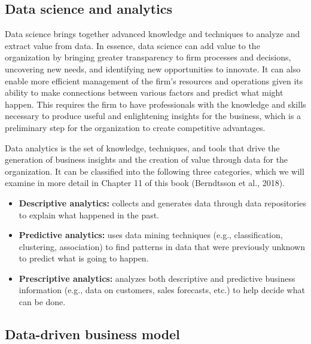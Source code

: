 \documentclass[
  letterpaper,
  DIV=11,
  numbers=noendperiod]{scrreprt}
\begin{document}
\hypertarget{data-science-and-analytics}{%
\subsection{Data science and
analytics}\label{data-science-and-analytics}}

Data science brings together advanced knowledge and techniques to
analyze and extract value from data. In essence, data science can add
value to the organization by bringing greater transparency to firm
processes and decisions, uncovering new needs, and identifying new
opportunities to innovate. It can also enable more efficient management
of the firm's resources and operations given its ability to make
connections between various factors and predict what might happen. This
requires the firm to have professionals with the knowledge and skills
necessary to produce useful and enlightening insights for the business,
which is a preliminary step for the organization to create competitive
advantages.

Data analytics is the set of knowledge, techniques, and tools that drive
the generation of business insights and the creation of value through
data for the organization. It can be classified into the following three
categories, which we will examine in more detail in Chapter 11 of this
book (Berndtsson et al., 2018).

\begin{itemize}
\item
  \textbf{Descriptive analytics:} collects and generates data through
  data repositories to explain what happened in the past.
\item
  \textbf{Predictive analytics:} uses data mining techniques (e.g.,
  classification, clustering, association) to find patterns in data that
  were previously unknown to predict what is going to happen.
\item
  \textbf{Prescriptive analytics:} analyzes both descriptive and
  predictive business information (e.g., data on customers, sales
  forecasts, etc.) to help decide what can be done.
\end{itemize}

\hypertarget{data-driven-business-model}{%
\subsection{Data-driven business
model}\label{data-driven-business-model}}
\end{document}
